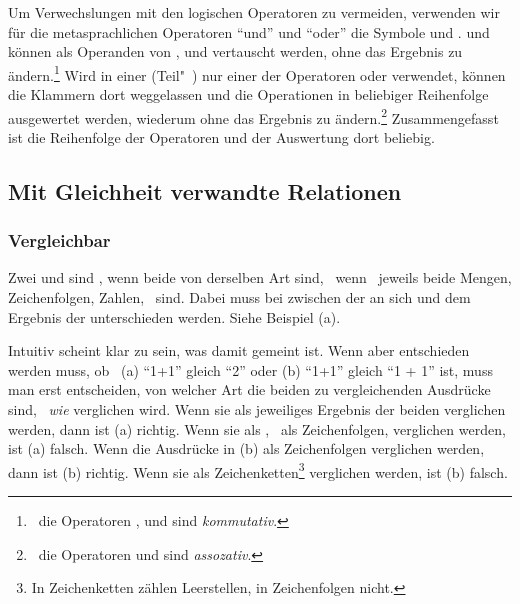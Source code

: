 Um Verwechslungen mit den logischen Operatoren zu vermeiden, verwenden wir für die metasprachlichen Operatoren \enquote{und} und \enquote{oder} die Symbole \symqt{\metaandsym} und \symqt{\metaorsym}.
 und  können als Operanden von \objqt{\metaequiv}, \objqt{\metaandsym} und \objqt{\metaorsym} vertauscht werden, ohne das Ergebnis zu ändern.\footnote{%
	\textDh\ die Operatoren \objqt{\metaequiv}, \objqt{\metaandsym} und \objqt{\metaorsym} sind \emph{kommutativ}.%
} %
Wird in einer (Teil"~) nur einer der Operatoren \objqt{\metaandsym} oder \objqt{\metaorsym} verwendet, können die Klammern dort weggelassen und die Operationen in beliebiger Reihenfolge ausgewertet werden, wiederum ohne das Ergebnis zu ändern.\footnote{%
	\textDh\ die Operatoren \objqt{\metaandsym} und \objqt{\metaorsym} sind \emph{assozativ}.%
} %
Zusammengefasst ist die Reihenfolge der Operatoren und der Auswertung dort beliebig.

\subsection{Mit Gleichheit verwandte Relationen}%
\label{sub:Gleichheit}

\subsubsection{Vergleichbar}%
\label{subsub:Vergleichbar}

Zwei   und  sind \emph{}, wenn beide von derselben Art sind, \textdh\ wenn \textzB\ jeweils beide Mengen, Zeichenfolgen, Zahlen, \textusw\ sind.
Dabei muss bei  zwischen der  an sich und dem Ergebnis der  unterschieden werden. Siehe Beispiel (a).

Intuitiv scheint klar zu sein, was damit  gemeint ist.
Wenn aber entschieden werden muss, ob \textzB\ (a) \enquote{1+1} gleich \enquote{2} oder (b) \enquote{1+1} gleich \enquote{1 + 1} ist, muss man erst entscheiden, von welcher Art die beiden zu vergleichenden Ausdrücke sind, \textdh\ \emph{wie} verglichen wird.
Wenn sie als jeweiliges Ergebnis der beiden  verglichen werden, dann ist (a) richtig.
Wenn sie als , \textdh\ als Zeichenfolgen, verglichen werden, ist (a) falsch.
Wenn die Ausdrücke in (b) als Zeichenfolgen verglichen werden, dann ist (b) richtig.
Wenn sie als Zeichenketten\footnote{%
	In Zeichenketten zählen Leerstellen, in Zeichenfolgen nicht.%
} verglichen werden, ist (b) falsch.

